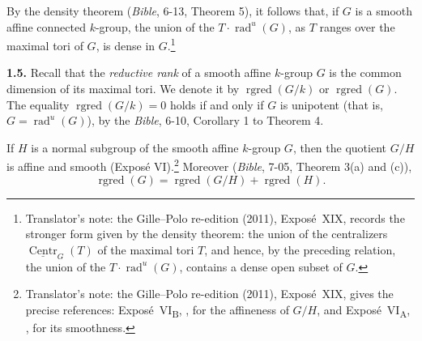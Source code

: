 By the density theorem (\emph{Bible}, 6-13, Theorem 5), it follows that, if
\(G\) is a smooth affine connected \(k\)-group, the union of the
\(T\cdot\operatorname{rad}^{u}(G)\), as \(T\) ranges over the maximal tori of
\(G\), is dense in \(G\).\footnote{Translator's note: the Gille--Polo re-edition (2011), Exposé~XIX, records the
stronger form given by the density theorem: the union of the centralizers
\(\underline{\operatorname{Centr}}_G(T)\) of the maximal tori \(T\), and hence,
by the preceding relation, the union of the
\(T\cdot\operatorname{rad}^{u}(G)\), contains a dense open subset of \(G\).}

\par\medskip\noindent{}\textbf{1.5.}\quad
Recall that the \emph{reductive rank} of a smooth affine \(k\)-group \(G\) is
the common dimension of its maximal tori.  We denote it by
\(\operatorname{rgred}(G/k)\) or \(\operatorname{rgred}(G)\).  The equality
\(\operatorname{rgred}(G/k)=0\) holds if and only if \(G\) is unipotent
(that is, \(G=\operatorname{rad}^{u}(G)\)), by the \emph{Bible}, 6-10,
Corollary 1 to Theorem 4.

If \(H\) is a normal subgroup of the smooth affine \(k\)-group \(G\), then the
quotient \(G/H\) is affine and smooth (Exposé VI).\footnote{Translator's note: the Gille--Polo re-edition (2011), Exposé~XIX, gives the precise
references: Exposé~VI\textsubscript{B}, , for the affineness of \(G/H\),
and Exposé~VI\textsubscript{A}, , for its smoothness.}  Moreover (\emph{Bible}, 7-05,
Theorem 3(a) and (c)),
\[
  \operatorname{rgred}(G)
  =
  \operatorname{rgred}(G/H)+\operatorname{rgred}(H).
\]
